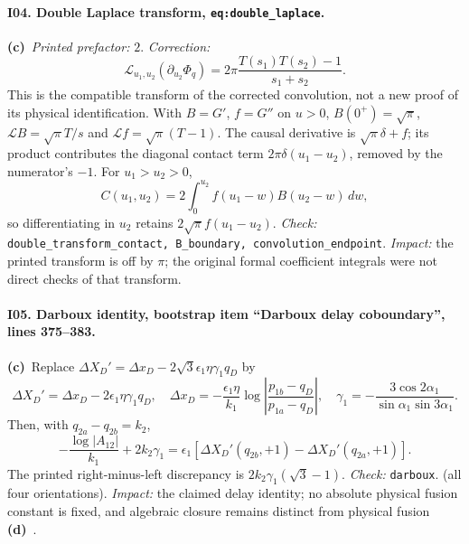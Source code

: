 \documentclass[11pt,a4paper]{article}
\newcommand{\C}{\textbf{(c)}\ }
\newcommand{\D}{\textbf{(d)}\ }
\newcommand{\file}[1]{\nolinkurl{#1}}
\newcommand{\test}[1]{\textit{Check:} \file{#1}.}
\begin{document}
\paragraph{I04. Double Laplace transform, \file{eq:double_laplace}.}
\C \textit{Printed prefactor:} $2$. \textit{Correction:}
\[
 \mathcal L_{u_1,u_2}(\partial_{u_2}\Phi_q)
 =2\pi\frac{T(s_1)T(s_2)-1}{s_1+s_2}.
\]
This is the compatible transform of the corrected convolution, not a new
proof of its physical identification. With $B=G'$, $f=G''$ on $u>0$,
$B(0^+)=\sqrt\pi$, $\mathcal LB=\sqrt\pi T/s$ and
$\mathcal Lf=\sqrt\pi(T-1)$. The causal derivative is
$\sqrt\pi\delta+f$; its product contributes the diagonal contact term
$2\pi\delta(u_1-u_2)$, removed by the numerator's $-1$.
For $u_1>u_2>0$,
\[
 C(u_1,u_2)=2\int_0^{u_2}f(u_1-w)B(u_2-w)\,dw,
\]
so differentiating in $u_2$ retains $2\sqrt\pi f(u_1-u_2)$.
\test{double_transform_contact, B_boundary, convolution_endpoint}
\textit{Impact:} the printed transform is off by $\pi$; the original
formal coefficient integrals were not direct checks of that transform.

\paragraph{I05. Darboux identity, bootstrap item ``Darboux delay coboundary'', lines 375--383.}
\C Replace
$\Delta X_D'=\Delta x_D-2\sqrt3\epsilon_1\eta\gamma_1q_D$
by
\[
 \Delta X_D'=\Delta x_D-2\epsilon_1\eta\gamma_1q_D,
 \quad \Delta x_D=-\frac{\epsilon_1\eta}{k_1}
      \log\left|\frac{p_{1b}-q_D}{p_{1a}-q_D}\right|,
 \quad \gamma_1=-\frac{3\cos2\alpha_1}{\sin\alpha_1\sin3\alpha_1}.
\]
Then, with $q_{2a}-q_{2b}=k_2$,
\[
 -\frac{\log|A_{12}|}{k_1}+2k_2\gamma_1
 =\epsilon_1[\Delta X_D'(q_{2b},+1)-\Delta X_D'(q_{2a},+1)].
\]
The printed right-minus-left discrepancy is
$2k_2\gamma_1(\sqrt3-1)$. \test{darboux} (all four orientations).
\textit{Impact:} the claimed delay identity; no absolute physical fusion
constant is fixed, and algebraic closure remains distinct from physical fusion \D.
\end{document}
